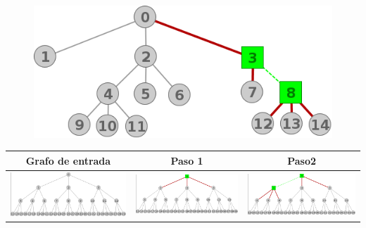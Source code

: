 \begin{figure}[H]
\includegraphics[scale = 0.5]{img/ej3/constructiva_golosa/tree_st12.png}
\end{figure}

	\begin{center}
		\begin{tabular}{ |c||c||c| }
			\hline
			Grafo de entrada & Paso 1 & Paso2 \\
			\hline\hline
			\includegraphics[scale = 0.15]{img/ej3/constructiva_golosa/ctree_st0.png} &
			\includegraphics[scale = 0.15]{img/ej3/constructiva_golosa/ctree_st1.png} &
			\includegraphics[scale = 0.15]{img/ej3/constructiva_golosa/ctree_st2.png} \\

\end{tabular}
\end{center}
